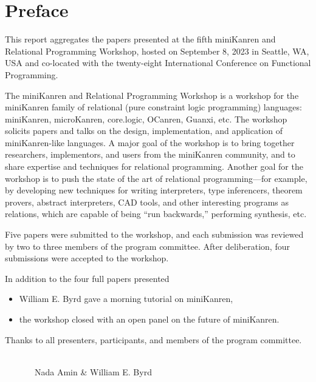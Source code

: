 \documentclass[a4paper]{book}
\date{September 8, 2023}
\author{Nada Amin \and William E. Byrd}
\begin{document}
\frontmatter
\setcounter{page}{3}  %
\chapter*{Preface}
This report aggregates the papers presented at the fifth miniKanren
and Relational Programming Workshop, hosted on September 8, 2023 in
Seattle, WA, USA and co-located with the twenty-eight International
Conference on Functional Programming.

\vspace{5pt}
\noindent
The miniKanren and Relational Programming Workshop is a workshop for the miniKanren family of relational (pure constraint logic programming) languages: miniKanren, microKanren, core.logic, OCanren, Guanxi, etc. The workshop solicits papers and talks on the design, implementation, and application of miniKanren-like languages. A major goal of the workshop is to bring together researchers, implementors, and users from the miniKanren community, and to share expertise and techniques for relational programming. Another goal for the workshop is to push the state of the art of relational programming—for example, by developing new techniques for writing interpreters, type inferencers, theorem provers, abstract interpreters, CAD tools, and other interesting programs as relations, which are capable of being “run backwards,” performing synthesis, etc.

\vspace{5pt}
\noindent
Five papers were submitted to the workshop, and each submission was reviewed by
two to three members of the program committee.  After deliberation, four submissions were accepted to the workshop.

\vspace{5pt}
\noindent
In addition to the four full papers presented
\begin{itemize}
\item William E. Byrd gave a morning tutorial on miniKanren,
\item the workshop closed with an open panel on the future of miniKanren.
\end{itemize}

\vspace{5pt}
\noindent
Thanks to all presenters, participants, and members of the
program committee.

\ \\

\ \ \ \ \ \ \ Nada Amin \& William E. Byrd
\end{document}
